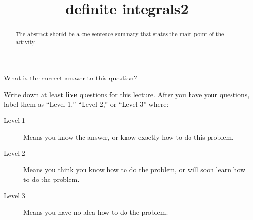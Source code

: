 \documentclass{ximera}
\title{definite integrals2}
\begin{document}
\begin{abstract}
  The abstract should be a one sentence summary that states the main point of the activity.
\end{abstract}

\maketitle

\begin{question}
  What is the correct answer to this question?

  
    \begin{multipleChoice}
    \end{multipleChoice}  
  
\end{question}

Write down at least \textbf{five} questions for this lecture. After
you have your questions, label them as ``Level 1,'' ``Level 2,'' or ``Level 3'' where:
\begin{description}
\item[Level 1] Means you know the answer, or know exactly how to do this problem.
\item[Level 2] Means you think you know how to do the problem, or will soon learn how to do the problem.
\item[Level 3] Means you have no idea how to do the problem. 
\end{description}
\begin{question}
  \begin{freeResponse}
  \end{freeResponse}
\end{question}
\end{document}
